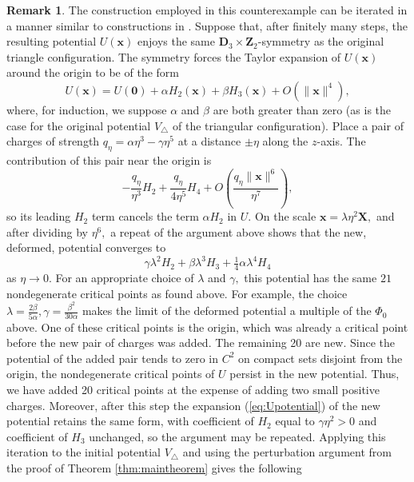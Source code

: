 \documentclass[12pt,a4paper]{article}
\theoremstyle{plain}
\theoremstyle{definition}
\newtheorem{rmk}{Remark}
\begin{document}
	\begin{rmk}
		The construction employed in this counterexample can be iterated in a manner similar to constructions in \cite{edelsbruner2026counting}. Suppose that, after finitely many steps, the resulting potential $U(\mathbf x)$ enjoys the same \(\mathbf{D}_3\times\mathbf{Z}_2\)-symmetry as the original triangle configuration. The symmetry forces the Taylor expansion of $U(\mathbf x)$ around the origin to be of the form
		\begin{equation}\label{eq:Upotential}
			U(\mathbf x) = U(\mathbf 0) + \alpha H_2(\mathbf x) + \beta H_3(\mathbf x) + O(\lVert \mathbf x \rVert^4),
		\end{equation}
		where, for induction, we suppose \(\alpha\) and \(\beta\) are both greater than zero (as is the case for the original potential \(V_\triangle\) of the triangular configuration). Place a pair of charges of strength $q_\eta = \alpha \eta^3 - \gamma \eta^5$ at a distance $\pm \eta$ along the $z$-axis. The contribution of this pair near the origin is
		\begin{equation*}
			-\frac{q_\eta}{\eta^3}H_2 + \frac{q_\eta}{4\eta^5}H_4 + O \left(\frac{q_\eta \lVert \mathbf x \rVert^6}{\eta^7}\right),
		\end{equation*}
		so its leading $H_2$ term cancels the term \(\alpha H_2\) in \(U\). On the scale $\mathbf x = \lambda \eta^2 \mathbf X,$ and after dividing by $\eta^6,$ a repeat of the argument above shows that the new, deformed, potential converges to
		\begin{equation*}
			\gamma \lambda^2 H_2 + \beta \lambda^3 H_3 + \tfrac{1}{4} \alpha \lambda^4 H_4
		\end{equation*}
		as $\eta \to 0.$ For an appropriate choice of $\lambda$ and $\gamma,$ this potential has the same $21$ nondegenerate critical points as found above. For example, the choice $\lambda=\frac{2\beta}{5\alpha}, \gamma=\frac{\beta^2}{30\alpha}$ makes the limit of the deformed potential a multiple of the $\Phi_0$ above. One of these critical points is the origin, which was already a critical point before the new pair of charges was added. The remaining 20 are new. Since the potential of the added pair tends to zero in $C^2$ on compact sets disjoint from the origin, the nondegenerate critical points of $U$ persist in the new potential. Thus, we have added 20 critical points at the expense of adding two small positive charges. Moreover, after this step the expansion (\ref{eq:Upotential}) of the new potential retains the same form, with coefficient of $H_2$ equal to $\gamma \eta^2 > 0$ and coefficient of $H_3$ unchanged, so the argument may be repeated. Applying this iteration to the initial potential $V_{\triangle}$ and using the perturbation argument from the proof of Theorem \ref{thm:maintheorem} gives the following
	\end{rmk}
	
\end{document}

